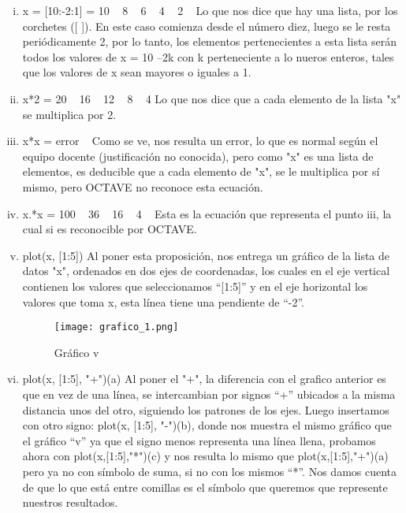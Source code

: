 \documentclass[a4paper]{article}
\begin{document}
\begin{enumerate}[i)]
\item x = [10:-2:1] = 10   8   6   4   2   Lo que nos dice que hay una lista, por los corchetes ([ ]). En este caso comienza desde el número diez, luego se le resta periódicamente 2, por lo tanto, los elementos pertenecientes a esta lista serán todos los valores de x = 10 –2k  con k perteneciente a lo nueros enteros, tales que los valores de x sean mayores o iguales a 1.
\item x*2 = 20   16   12   8   4  Lo que nos dice que a cada elemento de la lista "x" se multiplica por 2.
\item x*x = error   Como se ve, nos resulta un error, lo que es normal según el equipo docente (justificación no conocida), pero como "x" es una lista de elementos, es deducible que a cada elemento de "x", se le multiplica por sí mismo, pero OCTAVE no reconoce esta ecuación.
\item x.*x = 100\hspace{0.1cm}   36   16   4   Esta es la ecuación que representa el punto iii, la cual si es reconocible por OCTAVE.
\item plot(x, [1:5]) Al poner esta proposición, nos entrega un gráfico de la lista de datos "x", ordenados en dos ejes de coordenadas, los cuales en el eje vertical contienen los valores que seleccionamos “[1:5]” y en el eje horizontal los valores que toma x, esta línea tiene una pendiente de “-2”.

\begin{figure}[H]\centering
\texttt{[image: grafico\_1.png]}
\caption{\label{foto1}Gráfico v}
\end{figure}
\item plot(x, [1:5], "+")(a)  Al poner el "+", la diferencia con el grafico anterior es que en vez de una línea, se intercambian por signos “+” ubicados a la misma distancia unos del otro, siguiendo los patrones de los ejes. Luego insertamos con otro signo: plot(x, [1:5], "-")(b), donde nos muestra el mismo gráfico que el gráfico “v” ya que el signo menos representa una línea llena, probamos ahora con plot(x,[1:5],"*")(c) y nos resulta lo mismo que plot(x,[1:5],"+")(a) pero ya no con símbolo de suma, si no con los mismos “*”.
Nos damos cuenta de que lo que está entre comillas es el símbolo que queremos que represente nuestros resultados.


\end{enumerate}
\end{document}
